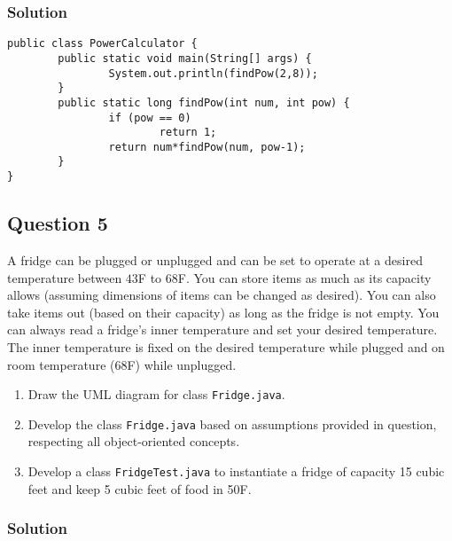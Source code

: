 \documentclass[12pt,letterpaper,twoside]{article}
\begin{document}
\subsubsection*{Solution}

\lstset{language=java, tabsize=2}
\begin{lstlisting}
public class PowerCalculator {
		public static void main(String[] args) {
				System.out.println(findPow(2,8));
		}
		public static long findPow(int num, int pow) {
				if (pow == 0)
						return 1;
				return num*findPow(num, pow-1);
		}
}
\end{lstlisting}

\newpage

\subsection*{Question 5}

A fridge can be plugged or unplugged and can be set to operate at a desired temperature between $43$F to $68$F. You can store items as much as its capacity allows (assuming dimensions of items can be changed as desired). You can also take items out (based on their capacity) as long as the fridge is not empty.
You can always read a fridge's inner temperature and set your desired temperature. The inner temperature is fixed on the desired temperature while plugged and on room temperature (68F) while unplugged.

\begin{enumerate}[label=(\alph*)]
\item Draw the UML diagram for class \texttt{Fridge.java}.
\item Develop the class \texttt{Fridge.java} based on assumptions provided in question, respecting all object-oriented concepts.
\item Develop a class \texttt{FridgeTest.java} to instantiate a fridge of capacity 15 cubic feet and keep 5 cubic feet of food in 50F.
\end{enumerate}

\subsubsection*{Solution}
\end{document}
